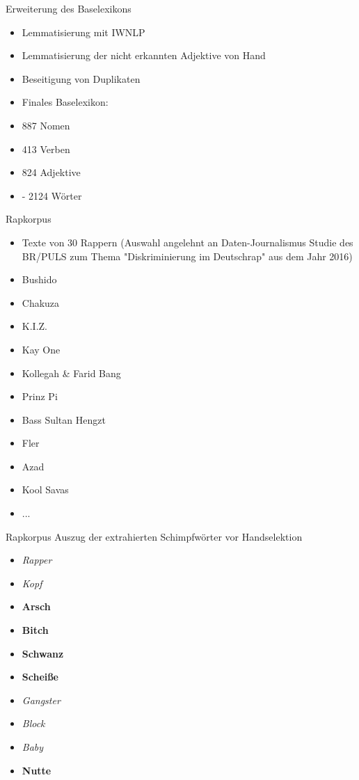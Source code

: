 \documentclass{beamer}
\begin{document}
\begin{frame}{Erweiterung des Baselexikons}
	\begin{itemize}

		\item Lemmatisierung mit IWNLP
		\item Lemmatisierung der nicht erkannten Adjektive von Hand
		\item Beseitigung von Duplikaten
		\item Finales Baselexikon:
		\item 887 Nomen
		\item 413 Verben
		\item 824 Adjektive
		\item  - 2124 Wörter

	\end{itemize}
\end{frame}

\begin{frame}{Rapkorpus}
\begin{itemize}
\item Texte von 30 Rappern (Auswahl angelehnt an Daten-Journalismus Studie des BR/PULS zum Thema "Diskriminierung im Deutschrap" aus dem Jahr 2016)
	\item Bushido
	\item Chakuza
	\item K.I.Z.
	\item Kay One
	\item Kollegah \& Farid Bang
	\item Prinz Pi
	\item Bass Sultan Hengzt
	\item Fler
	\item Azad
	\item Kool Savas
	\item ...

\end{itemize}
\end{frame}

\begin{frame}{Rapkorpus}
Auszug der extrahierten Schimpfwörter vor Handselektion
\begin{itemize}
		
\item \emph{Rapper}
\item \emph{Kopf}
\item \textbf{Arsch}
\item \textbf{Bitch}
\item \textbf{Schwanz}
\item \textbf{Scheiße}
\item \emph{Gangster}
\item \emph{Block}
\item \emph{Baby}
\item \textbf{Nutte}
		
\end{itemize}
\end{frame}
\end{document}
